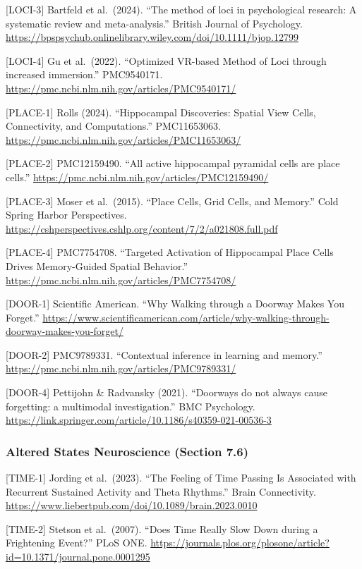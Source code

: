 \documentclass[
  11pt,
]{article}
\begin{document}
{[}LOCI-3{]} Bartfeld et al.~(2024). ``The method of loci in
psychological research: A systematic review and meta-analysis.'' British
Journal of Psychology.
\url{https://bpspsychub.onlinelibrary.wiley.com/doi/10.1111/bjop.12799}

{[}LOCI-4{]} Gu et al.~(2022). ``Optimized VR-based Method of Loci
through increased immersion.'' PMC9540171.
\url{https://pmc.ncbi.nlm.nih.gov/articles/PMC9540171/}

{[}PLACE-1{]} Rolls (2024). ``Hippocampal Discoveries: Spatial View
Cells, Connectivity, and Computations.'' PMC11653063.
\url{https://pmc.ncbi.nlm.nih.gov/articles/PMC11653063/}

{[}PLACE-2{]} PMC12159490. ``All active hippocampal pyramidal cells are
place cells.'' \url{https://pmc.ncbi.nlm.nih.gov/articles/PMC12159490/}

{[}PLACE-3{]} Moser et al.~(2015). ``Place Cells, Grid Cells, and
Memory.'' Cold Spring Harbor Perspectives.
\url{https://cshperspectives.cshlp.org/content/7/2/a021808.full.pdf}

{[}PLACE-4{]} PMC7754708. ``Targeted Activation of Hippocampal Place
Cells Drives Memory-Guided Spatial Behavior.''
\url{https://pmc.ncbi.nlm.nih.gov/articles/PMC7754708/}

{[}DOOR-1{]} Scientific American. ``Why Walking through a Doorway Makes
You Forget.''
\url{https://www.scientificamerican.com/article/why-walking-through-doorway-makes-you-forget/}

{[}DOOR-2{]} PMC9789331. ``Contextual inference in learning and
memory.'' \url{https://pmc.ncbi.nlm.nih.gov/articles/PMC9789331/}

{[}DOOR-4{]} Pettijohn \& Radvansky (2021). ``Doorways do not always
cause forgetting: a multimodal investigation.'' BMC Psychology.
\url{https://link.springer.com/article/10.1186/s40359-021-00536-3}

\subsubsection{Altered States Neuroscience (Section
7.6)}\label{altered-states-neuroscience-section-7.6}

{[}TIME-1{]} Jording et al.~(2023). ``The Feeling of Time Passing Is
Associated with Recurrent Sustained Activity and Theta Rhythms.'' Brain
Connectivity.
\url{https://www.liebertpub.com/doi/10.1089/brain.2023.0010}

{[}TIME-2{]} Stetson et al.~(2007). ``Does Time Really Slow Down during
a Frightening Event?'' PLoS ONE.
\url{https://journals.plos.org/plosone/article?id=10.1371/journal.pone.0001295}
\end{document}
